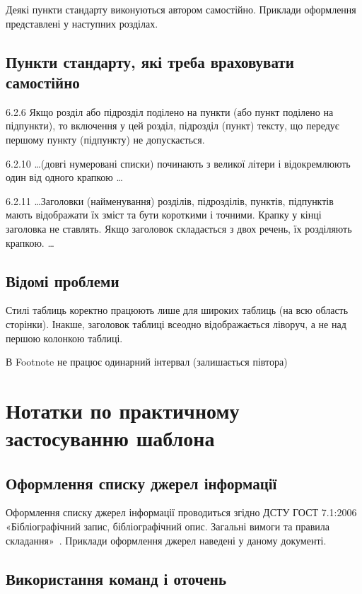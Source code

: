 Деякі пункти стандарту виконуються автором самостійно. Приклади оформлення представлені у наступних розділах.

\subsection{Пункти стандарту, які треба враховувати самостійно}

6.2.6 Якщо розділ або підрозділ поділено на пункти (або пункт поділено на підпункти), то включення у цей розділ, підрозділ (пункт) тексту, що передує першому пункту (підпункту) не допускається.

6.2.10 \dots (довгі нумеровані списки) починають з великої літери і відокремлюють один від одного крапкою \dots

6.2.11 \dots Заголовки (найменування) розділів, підрозділів, пунктів, підпунктів мають відображати їх зміст та бути короткими і точними. Крапку у кінці заголовка не ставлять. Якщо заголовок складається з двох речень, їх розділяють крапкою. \dots

\subsection{Відомі проблеми}

\begin{longEnumerate}
\item Стилі таблиць коректно працюють лише для широких таблиць (на всю область сторінки). Інакше, заголовок таблиці всеодно відображається ліворуч, а не над першою колонкою таблиці.
\item В Footnote не працює одинарний інтервал (залишається півтора) 
\end{longEnumerate}

\section{Нотатки по практичному застосуванню шаблона}
\subsection{Оформлення списку джерел інформації}

Оформлення списку джерел інформації проводиться згідно ДСТУ ГОСТ 7.1:2006
«Бібліографічний запис, бібліографічний опис. Загальні вимоги та правила
складання»~\cite{DSTU_GOST_7.1_2006}. Приклади оформлення джерел наведені у
даному документі.

\subsection{Використання команд і оточень}
